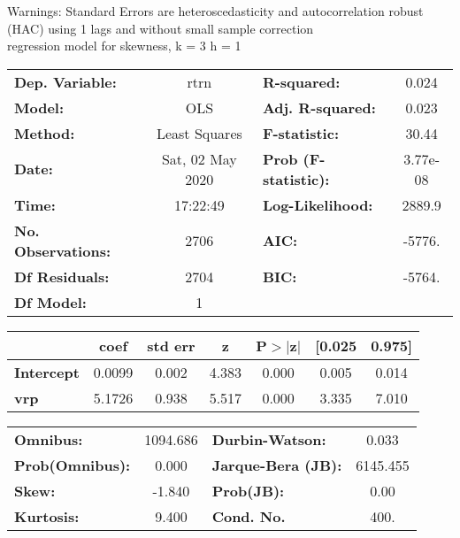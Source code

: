 Warnings: \newline
 [1] Standard Errors are heteroscedasticity and autocorrelation robust (HAC) using 1 lags and without small sample correction\\ 

regression model for skewness, k = 3 h = 1\begin{center}
\begin{tabular}{lclc}
\toprule
\textbf{Dep. Variable:}    &       rtrn       & \textbf{  R-squared:         } &     0.024   \\
\textbf{Model:}            &       OLS        & \textbf{  Adj. R-squared:    } &     0.023   \\
\textbf{Method:}           &  Least Squares   & \textbf{  F-statistic:       } &     30.44   \\
\textbf{Date:}             & Sat, 02 May 2020 & \textbf{  Prob (F-statistic):} &  3.77e-08   \\
\textbf{Time:}             &     17:22:49     & \textbf{  Log-Likelihood:    } &    2889.9   \\
\textbf{No. Observations:} &        2706      & \textbf{  AIC:               } &    -5776.   \\
\textbf{Df Residuals:}     &        2704      & \textbf{  BIC:               } &    -5764.   \\
\textbf{Df Model:}         &           1      & \textbf{                     } &             \\
\bottomrule
\end{tabular}
\begin{tabular}{lcccccc}
                   & \textbf{coef} & \textbf{std err} & \textbf{z} & \textbf{P$> |$z$|$} & \textbf{[0.025} & \textbf{0.975]}  \\
\midrule
\textbf{Intercept} &       0.0099  &        0.002     &     4.383  &         0.000        &        0.005    &        0.014     \\
\textbf{vrp}       &       5.1726  &        0.938     &     5.517  &         0.000        &        3.335    &        7.010     \\
\bottomrule
\end{tabular}
\begin{tabular}{lclc}
\textbf{Omnibus:}       & 1094.686 & \textbf{  Durbin-Watson:     } &    0.033  \\
\textbf{Prob(Omnibus):} &   0.000  & \textbf{  Jarque-Bera (JB):  } & 6145.455  \\
\textbf{Skew:}          &  -1.840  & \textbf{  Prob(JB):          } &     0.00  \\
\textbf{Kurtosis:}      &   9.400  & \textbf{  Cond. No.          } &     400.  \\
\bottomrule
\end{tabular}
\end{center}

